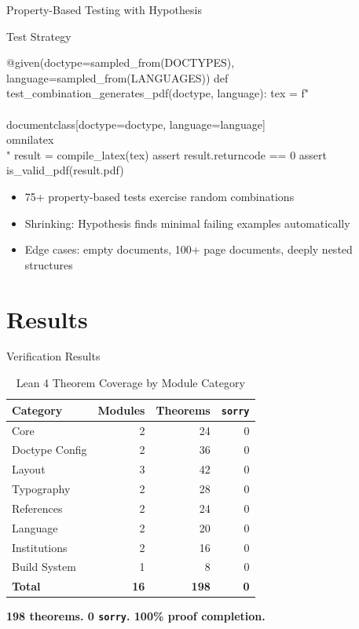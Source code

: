 \documentclass[
  doctype=beamer,
  beameraspectratio=169,
  beamertheme=Copenhagen,
  language=english,
]{omnilatex}
\begin{document}
\begin{frame}[fragile]{Property-Based Testing with Hypothesis}
  \begin{block}{Test Strategy}
    \begin{semiverbatim}
@given(doctype=sampled_from(DOCTYPES),
       language=sampled_from(LANGUAGES))
def test_combination_generates_pdf(doctype, language):
    tex = f"\\\\documentclass[doctype=doctype,
           language=language]\\{omnilatex\\}"
    result = compile_latex(tex)
    assert result.returncode == 0
    assert is_valid_pdf(result.pdf)
    \end{semiverbatim}
  \end{block}

  \begin{itemize}
    \item 75+ property-based tests exercise random combinations
    \item Shrinking: Hypothesis finds minimal failing examples automatically
    \item Edge cases: empty documents, 100+ page documents, deeply nested structures
  \end{itemize}
\end{frame}

\section{Results}

\begin{frame}{Verification Results}
  \begin{table}
    \centering
    \caption{Lean 4 Theorem Coverage by Module Category}
    \begin{tabular}{l r r r}
      \hline
      Category         & Modules & Theorems & \texttt{sorry} \\
      \hline
      Core             & 2  & 24   & 0 \\
      Doctype Config   & 2  & 36   & 0 \\
      Layout           & 3  & 42   & 0 \\
      Typography       & 2  & 28   & 0 \\
      References       & 2  & 24   & 0 \\
      Language         & 2  & 20   & 0 \\
      Institutions     & 2  & 16   & 0 \\
      Build System     & 1  & 8    & 0 \\
      \hline
      \textbf{Total}   & \textbf{16} & \textbf{198} & \textbf{0} \\
      \hline
    \end{tabular}
  \end{table}

  \begin{center}
    \textbf{198 theorems. 0 \texttt{sorry}. 100\% proof completion.}
  \end{center}
\end{frame}
\end{document}
